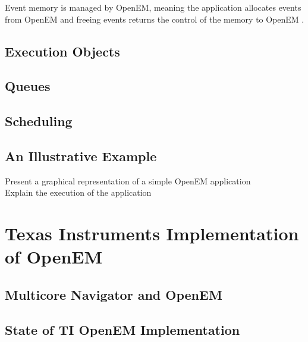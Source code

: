 Event memory is managed by OpenEM, meaning the application allocates events
from OpenEM and freeing events returns the control of the memory to OpenEM
\cite{openemintro}.
\subsection{Execution Objects}
\label{subsec:eos}
\subsection{Queues}
\label{subsec:queues}
\subsection{Scheduling}
\label{subsec:schedule}
\subsection{An Illustrative Example}
\label{subsec:example}
Present a graphical representation of a simple OpenEM application\\
Explain the execution of the application


\section{Texas Instruments Implementation of OpenEM}
\subsection{Multicore Navigator and OpenEM}
\subsection{State of TI OpenEM Implementation}


